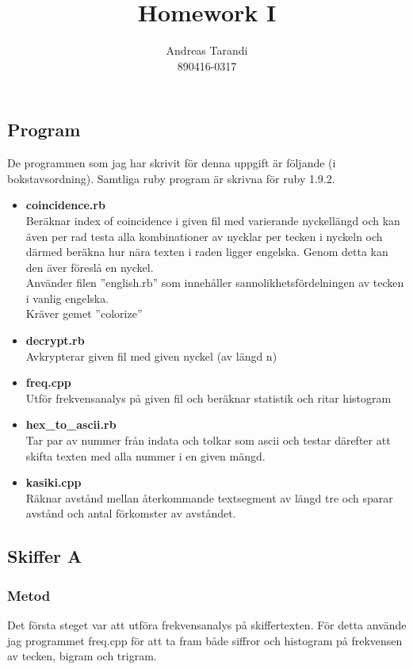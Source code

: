 \documentclass[a4paper,11pt]{article}
\author{Andreas Tarandi\\890416-0317}
\title{Homework I}
\begin{document}
	\maketitle

	\section{}
		\subsection{Program}
			De programmen som jag har skrivit för denna uppgift är följande (i bokstavsordning). Samtliga ruby program är skrivna för ruby 1.9.2.
			\begin{itemize}
				\item \textbf{coincidence.rb}	\\
					Beräknar index of coincidence i given fil med varierande nyckellängd och kan även per rad testa alla kombinationer av nycklar per tecken i nyckeln och därmed beräkna hur nära texten i raden ligger engelska. Genom detta kan den äver föreslå en nyckel.\\
					Använder filen ''english.rb'' som innehåller sannolikhetsfördelningen av tecken i vanlig engelska.
					\\
					Kräver gemet ''colorize''	
				\item \textbf{decrypt.rb}	\\
					Avkrypterar given fil med given nyckel (av längd n)
				\item \textbf{freq.cpp}\\
					Utför frekvensanalys på given fil och beräknar statistik och ritar histogram
				\item \textbf{hex\_to\_ascii.rb}\\
					Tar par av nummer från indata och tolkar som ascii och testar därefter att skifta texten med alla nummer i en given mängd. 
				\item \textbf{kasiki.cpp}	\\
					Räknar avstånd mellan återkommande textsegment av längd tre och sparar avstånd och antal förkomster av avståndet.
			\end{itemize}
		\subsection{Skiffer A}
			\subsubsection{Metod}
			Det första steget var att utföra frekvensanalys på skiffertexten. För detta använde jag programmet freq.cpp för att 
			ta fram både siffror och histogram på frekvensen av tecken, bigram och trigram.
\end{document}

